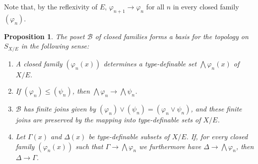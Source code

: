 \documentclass{article}
\newtheorem{proposition}[theorem]{Proposition}
\theoremstyle{definition}
\newcommand{\B}{\mathcal{B}}
\begin{document}
Note that, by the reflexivity of $E$, $\varphi_{n+1} \rightarrow \varphi_n$ for all $n$ in every closed family $(\varphi_n)$.

\begin{proposition}\label{proposition:closed-families-form-basis}
  The poset $\B$ of closed families forms a basis for the topology on $S_{X/E}$ in the following sense:
  \begin{enumerate}
  \item\label{enumlabel:functor-on-objects} A closed family $(\varphi_n(x))$ determines a type-definable set $\bigwedge \varphi_n(x)$ of $X/E$.
  \item\label{enumlabel:functor-on-inequalities} If $(\varphi_n) \leq (\psi_n)$, then $\bigwedge \varphi_n \rightarrow \bigwedge \psi_n$.
  \item\label{enumlabel:functor-preserves-finite-joins} $\B$ has finite joins given by $(\varphi_n) \vee (\psi_n) = (\varphi_n \vee \psi_n)$, and these finite joins are preserved by the mapping into type-definable sets of $X/E$.
  \item\label{enumlabel:functor-induces-site-structure} Let $\Gamma(x)$ and $\Delta(x)$ be type-definable subsets of $X/E$. If, for every closed family $(\varphi_n(x))$ such that $\Gamma \rightarrow \bigwedge \varphi_n$ we furthermore have $\Delta \rightarrow \bigwedge \varphi_n$, then $\Delta \rightarrow \Gamma$.
  \end{enumerate}
\end{proposition}
\end{document}
